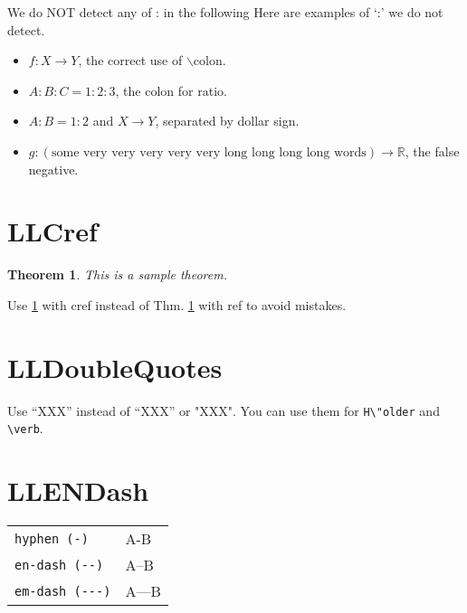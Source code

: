 \documentclass[a4paper]{article}
\newtheorem{theorem}{Theorem}
\begin{document}
\vspace{\baselineskip}

\begin{itembox}{We do NOT detect any of : in the following}
	Here are examples of `:' we do not detect.
	\begin{itemize}
		\item $f\colon X \to Y$, the correct use of $\backslash$colon.
		\item $A:B:C = 1:2:3$, the colon for ratio.
		\item $A:B = 1:2$ and $X \to Y$, separated by dollar sign.
		\item $g: (\text{some very very very very very long long long long words}) \to \mathbb{R}$, the false negative.
	\end{itemize}
\end{itembox}


\section{LLCref}

\begin{theorem}\label{thm:sample}
	This is a sample theorem.
\end{theorem}

Use \cref{thm:sample} with cref instead of Thm. \ref{thm:sample} with ref to avoid mistakes.

\section{LLDoubleQuotes}

Use ``XXX'' instead of “XXX” or "XXX".
You can use them for \verb|H\"older| and \verb"\verb".


\section{LLENDash}

\begin{table}[H]
	\centering
	\begin{tabular}{ll}
		\verb|hyphen (-)|    & A-B   \\
		\verb|en-dash (--)|  & A--B  \\
		\verb|em-dash (---)| & A---B
	\end{tabular}
\end{table}
\end{document}
